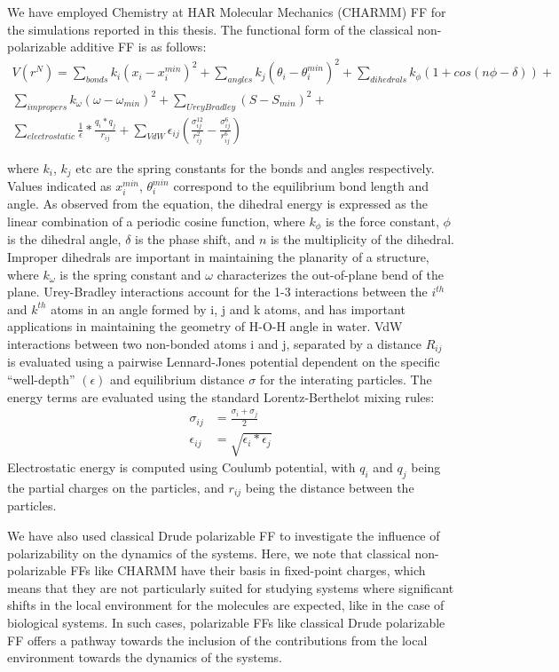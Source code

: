 We have employed Chemistry at HAR Molecular Mechanics (CHARMM) FF for the simulations reported in this thesis. The functional form of the classical non-polarizable additive FF is as follows:
\begin{multline*}
    V(r^N) = \sum_{bonds}^{}k_i(x_i-x_i^{min})^2 + \sum_{angles}^{}k_j(\theta_i-\theta_i^{min})^2 + \sum_{dihedrals}^{}k_{\phi}(1 + cos(n\phi-\delta)) + \\ \sum_{impropers}^{} k_{\omega}(\omega - \omega_{min})^2 + \sum_{UreyBradley}^{}(S-S_{min})^2 + \\ \sum_{electrostatic}^{}\frac{1}{\epsilon}*\frac{q_i * q_j}{r_{ij}} +  \sum_{VdW}^{}\epsilon_{ij}(\frac{\sigma_{ij}^{12}}{r_{ij}^2}-\frac{\sigma_{ij}^{6}}{r_{ij}^6})
\end{multline*}

where $k_i$, $k_j$ etc are the spring constants for the bonds and angles respectively. Values indicated as $x_{i}^{min}$, $\theta_{i}^{min}$ correspond to the equilibrium bond length and angle. As observed from the equation, the dihedral energy is expressed as the linear combination of a periodic cosine function, where $k_{\phi}$ is the force constant, $\phi$ is the dihedral angle, $\delta$ is the phase shift, and $n$ is the multiplicity of the dihedral. Improper dihedrals are important in maintaining the planarity of a structure, where $k_{\omega}$ is the spring constant and $\omega$ characterizes the out-of-plane bend of the plane. Urey-Bradley interactions account for the 1-3 interactions between the $i^{th}$ and $k^{th}$ atoms in an angle formed by i, j and k atoms, and has important applications in maintaining the geometry of H-O-H angle in water. VdW interactions between two non-bonded atoms i and j, separated by a distance $R_{ij}$ is evaluated using a pairwise Lennard-Jones potential dependent on the specific ``well-depth'' $(\epsilon)$ and equilibrium distance $\sigma$ for the interating particles. The energy terms are evaluated using the standard Lorentz-Berthelot mixing rules:
\begin{align*}
    \sigma_{ij} &=   \frac{\sigma_i + \sigma_j}{2} \\
    \epsilon_{ij} &= \sqrt{\epsilon_i*\epsilon_j}
\end{align*}
Electrostatic energy is computed using Coulumb potential, with $q_i$ and $q_j$ being the partial charges on the particles, and $r_{ij}$ being the distance between the particles.

We have also used classical Drude polarizable FF to investigate the influence of polarizability on the dynamics of the systems. Here, we note that classical non-polarizable FFs like CHARMM have their basis in fixed-point charges, which means that they are not particularly suited for studying systems where significant shifts in the local environment for the molecules are expected, like in the case of biological systems. In such cases, polarizable FFs like classical Drude polarizable FF offers a pathway towards the inclusion of the contributions from the local environment towards the dynamics of the systems.

